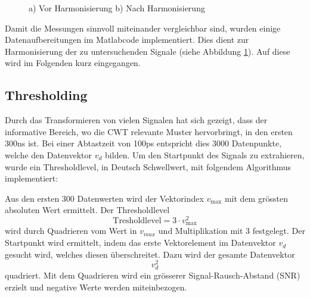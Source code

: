 \begin{refsection}
\begin{figure}
	\begin{subfigure}
		\centering
	\end{subfigure}
	\begin{subfigure}
		\centering
	\end{subfigure}	
\caption{a) Vor Harmonisierung b) Nach Harmonisierung}
\label{fig:Zeitsig}
\end{figure}

Damit die Messungen sinnvoll miteinander vergleichbar sind, wurden einige Datenaufbereitungen im Matlabcode implementiert.
Dies dient zur Harmonisierung der zu untersuchenden Signale (siehe Abbildung \ref{fig:Zeitsig}). 
Auf diese wird im Folgenden kurz eingegangen.

\subsection{Thresholding}
Durch das Transformieren von vielen Signalen hat sich gezeigt, dass der informative Bereich, wo die CWT relevante Muster hervorbringt, in den ersten 300ns ist.
Bei einer Abtastzeit von 100ps entspricht dies 3000 Datenpunkte, welche den Datenvektor $v_d$ bilden.
Um den Startpunkt des Signals zu extrahieren, wurde ein Thresholdlevel, in Deutsch Schwellwert, mit folgendem Algorithmus implementiert:

Aus den ersten 300 Datenwerten wird der Vektorindex $v_\text{max}$ mit dem grössten absoluten Wert ermittelt.
Der Thresholdlevel
\begin{equation}
\text{Tresholdlevel} = 3\cdot v_\text{max}^2
\end{equation}
wird durch Quadrieren vom Wert in $v_{max}$ und Multiplikation mit 3 festgelegt.
Der Startpunkt wird ermittelt, indem das erste Vektorelement im Datenvektor $v_d$ gesucht wird, welches diesen überschreitet.
Dazu wird der gesamte Datenvektor 
\begin{equation}
\text{$v_d^2$}
\end{equation}
quadriert.
Mit dem Quadrieren wird ein grösserer Signal-Rausch-Abstand (SNR) erzielt und negative Werte werden miteinbezogen.


\end{refsection}
